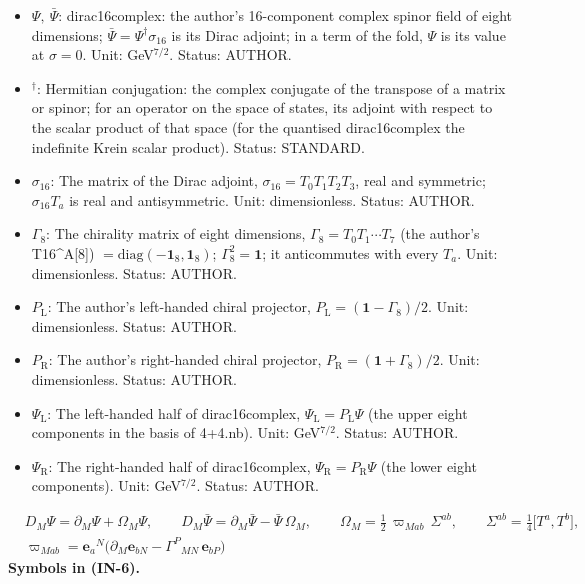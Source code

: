 \documentclass[
  10pt,
]{article}
\begin{document}
\begin{itemize}
  the metric: \(g_{MN} = \eta_{ab}\,\mathbf{e}^a{}_M\mathbf{e}^b{}_N\);
  \(\mathbf{e}_a{}^M\) is its inverse;
  \(\mathbf{e}_{bN} = \eta_{bc}\mathbf{e}^c{}_N\); \(\mathbf{e}^{(a)}\)
  is the frame one-form \(\mathbf{e}^a{}_M\,\mathrm{d}X^M\). Unit:
  dimensionless. Status: STANDARD.
\item
  \(\Psi,\ \bar\Psi\): dirac16complex: the author's 16-component complex
  spinor field of eight dimensions;
  \(\bar\Psi = \Psi^\dagger\sigma_{16}\) is its Dirac adjoint; in a term
  of the fold, \(\Psi\) is its value at \(\sigma = 0\). Unit:
  GeV\(^{7/2}\). Status: AUTHOR.
\item
  \({}^\dagger\): Hermitian conjugation: the complex conjugate of the
  transpose of a matrix or spinor; for an operator on the space of
  states, its adjoint with respect to the scalar product of that space
  (for the quantised dirac16complex the indefinite Krein scalar
  product). Status: STANDARD.
\item
  \(\sigma_{16}\): The matrix of the Dirac adjoint,
  \(\sigma_{16} = T_0T_1T_2T_3\), real and symmetric; \(\sigma_{16}T_a\)
  is real and antisymmetric. Unit: dimensionless. Status: AUTHOR.
\item
  \(\Gamma_8\): The chirality matrix of eight dimensions,
  \(\Gamma_8 = T_0T_1\cdots T_7\) (the author's T16\^{}A{[}8{]})
  \(= \mathrm{diag}(-\mathbf{1}_8, \mathbf{1}_8)\);
  \(\Gamma_8^2 = \mathbf{1}\); it anticommutes with every \(T_a\). Unit:
  dimensionless. Status: AUTHOR.
\item
  \(P_{\mathrm{L}}\): The author's left-handed chiral projector,
  \(P_{\mathrm{L}} = (\mathbf{1} - \Gamma_8)/2\). Unit: dimensionless.
  Status: AUTHOR.
\item
  \(P_{\mathrm{R}}\): The author's right-handed chiral projector,
  \(P_{\mathrm{R}} = (\mathbf{1} + \Gamma_8)/2\). Unit: dimensionless.
  Status: AUTHOR.
\item
  \(\Psi_{\mathrm{L}}\): The left-handed half of dirac16complex,
  \(\Psi_{\mathrm{L}} = P_{\mathrm{L}}\Psi\) (the upper eight components
  in the basis of 4+4.nb). Unit: GeV\(^{7/2}\). Status: AUTHOR.
\item
  \(\Psi_{\mathrm{R}}\): The right-handed half of dirac16complex,
  \(\Psi_{\mathrm{R}} = P_{\mathrm{R}}\Psi\) (the lower eight
  components). Unit: GeV\(^{7/2}\). Status: AUTHOR.
\end{itemize}

\[
\begin{aligned}
&D_M\Psi = \partial_M\Psi + \Omega_M\Psi,\qquad D_M\bar\Psi = \partial_M\bar\Psi - \bar\Psi\,\Omega_M,\qquad
 \Omega_M = \frac12\,\varpi_{Mab}\,\Sigma^{ab},\qquad \Sigma^{ab} = \frac14\big[T^a, T^b\big],\\
&\varpi_{Mab} = \mathbf{e}_a{}^N\big(\partial_M\mathbf{e}_{bN} - \Gamma^P{}_{MN}\,\mathbf{e}_{bP}\big)
\end{aligned} \tag{IN-6}
\] \textbf{Symbols in (IN-6).}
\end{document}
